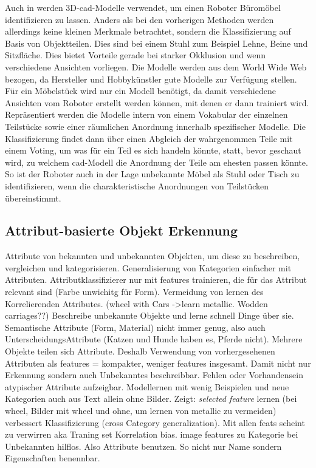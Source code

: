 Auch in \citep{modelsWWW} werden 3D-\gls{cad}-Modelle verwendet, um einen Roboter Büromöbel identifizieren zu lassen. Anders als bei den vorherigen Methoden werden allerdings keine kleinen Merkmale betrachtet, sondern die Klassifizierung auf Basis von Objektteilen. Dies sind bei einem Stuhl zum Beispiel Lehne, Beine und Sitzfläche. Dies bietet Vorteile gerade bei starker Okklusion und wenn verschiedene Ansichten vorliegen. Die Modelle werden aus dem World Wide Web bezogen, da Hersteller und Hobbykünstler gute Modelle zur Verfügung stellen. Für ein Möbelstück wird nur ein Modell benötigt, da damit verschiedene Ansichten vom Roboter erstellt werden können, mit denen er dann trainiert wird. Repräsentiert werden die Modelle intern von einem Vokabular der einzelnen Teilstücke sowie einer räumlichen Anordnung innerhalb spezifischer Modelle. Die Klassifizierung findet dann über einen Abgleich der wahrgenommen Teile mit einem Voting, um was für ein Teil es sich handeln könnte, statt, bevor geschaut wird, zu welchem \gls{cad}-Modell die Anordnung der Teile am ehesten passen könnte. So ist der Roboter auch in der Lage unbekannte Möbel als Stuhl oder Tisch zu identifizieren, wenn die charakteristische Anordnungen von Teilstücken übereinstimmt.   

\subsection{Attribut-basierte Objekt Erkennung}
\label{sec:aboi}

\cite{descObjbyAtr} \newline
Attribute von bekannten und unbekannten Objekten, um diese zu beschreiben, vergleichen und kategorisieren. Generalisierung von Kategorien einfacher mit Attributen. Attributklassifizierer nur mit features trainieren, die für das Attribut relevant sind (Farbe unwichitg für Form). Vermeidung von lernen des Korrelierenden Attributes. (wheel with Cars ->learn metallic. Wodden carriages??)\newline
Beschreibe unbekannte Objekte und lerne schnell Dinge über sie. \newline 
Semantische Attribute (Form, Material) nicht immer genug, also auch UnterscheidungsAttribute (Katzen und Hunde haben es, Pferde nicht).\newline
Mehrere Objekte teilen sich Attribute. Deshalb Verwendung von vorhergesehenen Attributen als features = kompakter, weniger features insgesamt. Damit nicht nur Erkennung sondern auch Unbekanntes beschreibbar. Fehlen oder Vorhandensein atypischer Attribute aufzeigbar. Modellernen mit wenig Beispielen und neue Kategorien auch aus Text allein ohne Bilder. \newline
Zeigt: \textit{selected feature} lernen (bei wheel, Bilder mit wheel und ohne, um lernen von metallic zu vermeiden) verbessert Klassifizierung (cross Category generalization). Mit allen feats scheint zu verwirren aka Traning set Korrelation bias. \newline
image features zu Kategorie bei Unbekannten hilflos. Also Attribute benutzen. So nicht nur Name sondern Eigenschaften benennbar.

